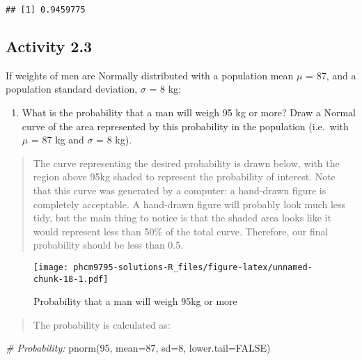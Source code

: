 \documentclass[
]{memoir}
\newenvironment{Shaded}{\begin{snugshade}}{\end{snugshade}}
\newcommand{\AttributeTok}[1]{\textcolor[rgb]{0.77,0.63,0.00}{#1}}
\newcommand{\CommentTok}[1]{\textcolor[rgb]{0.56,0.35,0.01}{\textit{#1}}}
\newcommand{\ConstantTok}[1]{\textcolor[rgb]{0.00,0.00,0.00}{#1}}
\newcommand{\DecValTok}[1]{\textcolor[rgb]{0.00,0.00,0.81}{#1}}
\newcommand{\FunctionTok}[1]{\textcolor[rgb]{0.00,0.00,0.00}{#1}}
\newcommand{\NormalTok}[1]{#1}
\providecommand{\tightlist}{%
  \setlength{\itemsep}{0pt}\setlength{\parskip}{0pt}}
\begin{document}
\begin{verbatim}
## [1] 0.9459775
\end{verbatim}

\hypertarget{activity-2.3}{%
\subsection*{Activity 2.3}\label{activity-2.3}}

If weights of men are Normally distributed with a population mean \(\mu\) = 87, and a population standard deviation, \(\sigma\) = 8 kg:

\begin{enumerate}
\def\labelenumi{\alph{enumi})}
\tightlist
\item
  What is the probability that a man will weigh 95 kg or more? Draw a Normal curve of the area represented by this probability in the population (i.e.~with \(\mu\) = 87 kg and \(\sigma\) = 8 kg).
\end{enumerate}

\begin{quote}
The curve representing the desired probability is drawn below, with the region above 95kg shaded to represent the probability of interest. Note that this curve was generated by a computer: a hand-drawn figure is completely acceptable. A hand-drawn figure will probably look much less tidy, but the main thing to notice is that the shaded area looks like it would represent less than 50\% of the total curve. Therefore, our final probability should be less than 0.5.
\end{quote}

\begin{figure}
\centering
\texttt{[image: phcm9795-solutions-R\_files/figure-latex/unnamed-chunk-18-1.pdf]}
\caption{\label{fig:unnamed-chunk-18}Probability that a man will weigh 95kg or more}
\end{figure}

\begin{quote}
The probability is calculated as:
\end{quote}

\begin{Shaded}
\begin{Highlighting}[]
\CommentTok{\# Probability:}
\FunctionTok{pnorm}\NormalTok{(}\DecValTok{95}\NormalTok{, }\AttributeTok{mean=}\DecValTok{87}\NormalTok{, }\AttributeTok{sd=}\DecValTok{8}\NormalTok{, }\AttributeTok{lower.tail=}\ConstantTok{FALSE}\NormalTok{)}
\end{Highlighting}
\end{Shaded}
\end{document}
